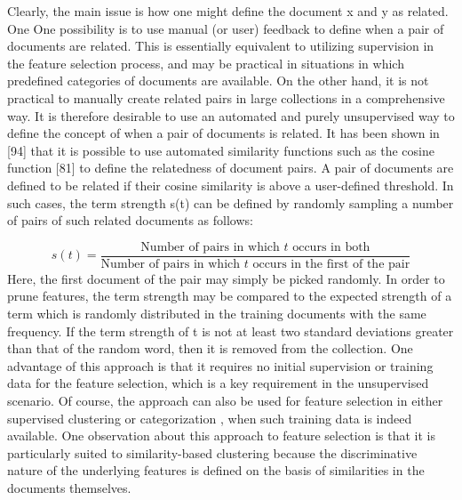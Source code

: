Clearly, the main issue is how one might define the document x and y as related. One One possibility is to use manual (or user) feedback to define when a pair of documents are related. This is essentially equivalent to utilizing supervision in the feature selection process, and may be practical in situations in which predefined categories of documents are available. On the other hand, it is not practical to manually create related pairs in large collections in a comprehensive way. It is therefore desirable to use an automated and purely unsupervised way to define the concept of when a pair of documents is related. It has been shown in [94] that it is possible to use automated similarity functions such as the cosine function [81] to define the relatedness of document pairs. A pair of documents are defined to be related if their cosine similarity is above a user-defined threshold. In such cases, the term strength s(t) can be defined by randomly sampling a number of pairs of such related documents as follows:

\[
s(t) = \frac{\text{Number of pairs in which $t$ occurs in both}} {\text{Number of pairs in which $t$ occurs in the first of the pair}}
\label{eq:samplingpairs} \tag{234}
\]
Here, the first document of the pair may simply be picked randomly. In order to prune features, the term strength may be compared to the expected strength of a term which is randomly distributed in the training documents with the same frequency. If the term strength of t is not at least two standard deviations greater than that of the random word, then it is removed from the collection.
One advantage of this approach is that it requires no initial supervision or training data for the feature selection, which is a key requirement in the unsupervised scenario. Of course, the approach can also be used for feature selection in either supervised clustering \cite{Bobadilla2013} or categorization \cite{Salakhutdinov2007}, when such training data is indeed available. One observation about this approach to feature selection is that it is particularly suited to similarity-based clustering because the discriminative nature of the underlying features is defined on the basis of similarities in the documents themselves.

